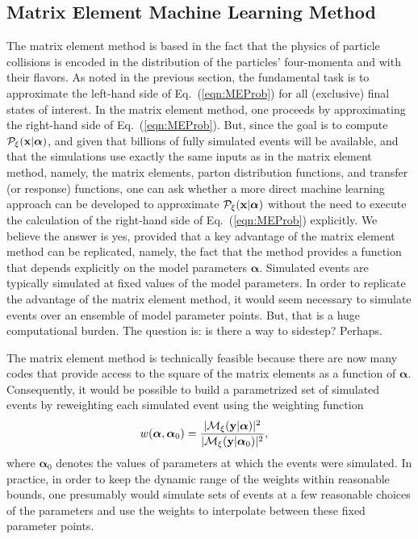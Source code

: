 \subsection{Matrix Element Machine Learning Method}
The matrix element method is based in the fact that the physics of particle collisions is encoded in the distribution of the particles' four-momenta and with their flavors. As noted in the previous section, the fundamental task is to approximate the left-hand side of Eq.~(\ref{eqn:MEProb}) for all (exclusive) final states of interest. In the matrix element method, one proceeds by approximating the right-hand side of Eq.~(\ref{eqn:MEProb}). But, since the goal is to compute $\mathcal{P}_{\xi}({\bf x}|{\boldsymbol\alpha})$, and given that billions of fully simulated events will be available, and that the simulations use exactly the same inputs as in the matrix element method, namely, the matrix elements, parton distribution functions, and transfer (or response) functions, one can ask whether a more direct machine learning approach can be developed to approximate  $\mathcal{P}_{\xi}({\bf x}|{\boldsymbol\alpha})$ without the need to execute the calculation of the right-hand side of Eq.~(\ref{eqn:MEProb}) explicitly. We believe the answer is yes, provided that a key advantage of the matrix element method can be replicated, namely, the fact that the method provides a function that depends explicitly on the model parameters ${\boldsymbol\alpha}$. Simulated events are typically simulated at fixed values of the model parameters. In order to replicate the advantage of the matrix element method, it would seem necessary to simulate events over an ensemble of model parameter points. But, that is a huge computational burden. The question is: is there a way to sidestep? Perhaps.

The matrix element method is technically feasible because there are now many codes that provide access to the square of the matrix elements as a function of ${\boldsymbol\alpha}$. Consequently, it would be possible to build a parametrized set of simulated events by reweighting each simulated event using the weighting function
\begin{align}
 w(\boldsymbol{\alpha}, \boldsymbol{\alpha}_0) & = \frac{|\mathcal{M}_{\xi}({\bf y}|\boldsymbol\alpha)|^2}{|\mathcal{M}_{\xi}({\bf y}|\boldsymbol\alpha_0)|^2},
\end{align}
where $\boldsymbol{\alpha}_0$ denotes the values of parameters at which the events were simulated. In practice, in order to keep the dynamic range of the weights within reasonable bounds, one presumably would simulate sets of events at a few reasonable choices of the parameters and use the weights to interpolate between these fixed parameter points.

